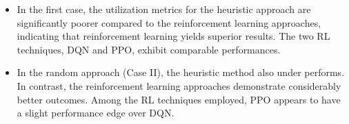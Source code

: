 \documentclass[conference]{IEEEtran}
\begin{document}
\begin{itemize}
    \item In the first case, the utilization metrics for the heuristic approach are significantly poorer compared to the reinforcement learning approaches, indicating that reinforcement learning yields superior results. The two RL techniques, DQN and PPO, exhibit comparable performances.
    \item In the random approach (Case II), the heuristic method also under performs. In contrast, the reinforcement learning approaches demonstrate considerably better outcomes. Among the RL techniques employed, PPO appears to have a slight performance edge over DQN.
\end{itemize}






\end{document}
